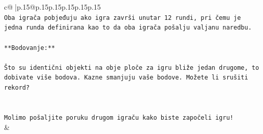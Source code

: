 \documentclass{article}
\begin{document}
{\begin{supertabular}{c@{$\;$}|p{.15\linewidth}@{}p{.15\linewidth}p{.15\linewidth}p{.15\linewidth}p{.15\linewidth}p{.15\linewidth}}
{{{\\ 
\texttt{Oba igrača pobjeđuju ako igra završi unutar 12 rundi, pri čemu je jedna runda definirana kao to da oba igrača pošalju valjanu naredbu.} \\
\\ 
\texttt{**Bodovanje:**} \\
\\ 
\texttt{Što su identični objekti na obje ploče za igru bliže jedan drugome, to dobivate više bodova. Kazne smanjuju vaše bodove. Možete li srušiti rekord?} \\
\\ 
\\ 
\texttt{Molimo pošaljite poruku drugom igraču kako biste započeli igru!} \\
            }
        }
    }
    & \\ \\


\end{supertabular}}
\end{document}
